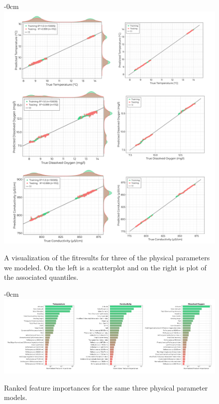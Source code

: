 \documentclass[journal,article,submit,pdftex,moreauthors]{Definitions/mdpi}
\begin{document}
\begin{figure}[H]
\begin{adjustwidth}{-\extralength}{0cm}
\centering
\includegraphics[width=16.0cm]{paper/figures/results/fits/physical-fitres.pdf}
\end{adjustwidth}
\caption{A visualization of the fitresults for three of the physical parameters we modeled. On the left is a scatterplot and on the right is plot of the associated quantiles.\label{fig:physical-fit}}
\end{figure}  

\begin{figure}[H]
\begin{adjustwidth}{-\extralength}{0cm}
\centering
\includegraphics[width=18.0cm]{paper/figures/results/fits/physical-ranking.pdf}
\end{adjustwidth}
\caption{Ranked feature importances for the same three physical parameter models.\label{fig:physical-fit}}
\end{figure}  
\end{document}

